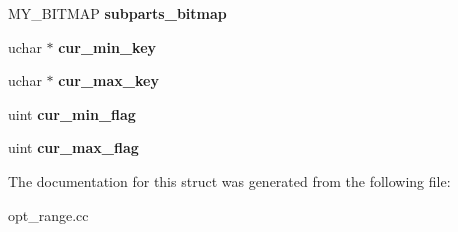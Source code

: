 \begin{DoxyCompactItemize}
\item 
\mbox{\label{structst__part__prune__param_aadee7d951d1b47d3f7c5a09958f8f338}} 
M\+Y\+\_\+\+B\+I\+T\+M\+AP {\bfseries subparts\+\_\+bitmap}
\item 
\mbox{\label{structst__part__prune__param_abb0a1021f2ec96ba476b9309b58d6672}} 
uchar $\ast$ {\bfseries cur\+\_\+min\+\_\+key}
\item 
\mbox{\label{structst__part__prune__param_a06071e2715b58852efd4fcdc286e712f}} 
uchar $\ast$ {\bfseries cur\+\_\+max\+\_\+key}
\item 
\mbox{\label{structst__part__prune__param_a227f03c5cf78a60f38bb9c7d878b91cc}} 
uint {\bfseries cur\+\_\+min\+\_\+flag}
\item 
\mbox{\label{structst__part__prune__param_a73e28fe2d06761579995a384adbe2f12}} 
uint {\bfseries cur\+\_\+max\+\_\+flag}
\end{DoxyCompactItemize}


The documentation for this struct was generated from the following file\+:\begin{DoxyCompactItemize}
\item 
opt\+\_\+range.\+cc\end{DoxyCompactItemize}
